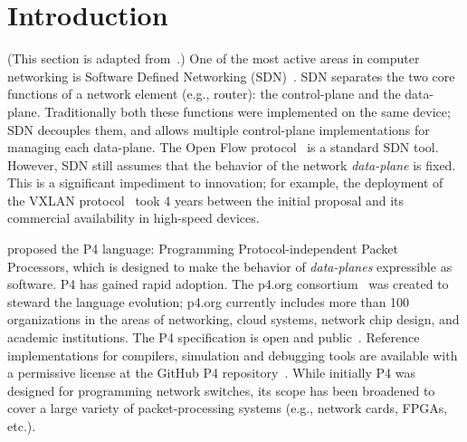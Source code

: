  \section{Introduction}\label{sec:introduction}

(This section is adapted from~\cite{budiu-osr17}.)  One of the most
 active areas in computer networking is Software Defined Networking
 (SDN)~\cite{rfc7426}.  SDN separates the two core functions of a
 network element (e.g., router): the control-plane and the data-plane.
 Traditionally both these functions were implemented on the same
 device; SDN decouples them, and allows multiple control-plane
 implementations for managing each data-plane.  The Open Flow
 protocol~\cite{mckeown-ccr08} is a standard SDN tool.  However, SDN
 still assumes that the behavior of the network \emph{data-plane} is
 fixed.  This is a significant impediment to innovation; for example,
 the deployment of the VXLAN protocol~\cite{rfc7348} took 4 years
 between the initial proposal and its commercial availability in
 high-speed devices.

\cite{bosshart-ccr14} proposed the P4 language: Programming
Protocol-independent Packet Processors, which is designed to make the
behavior of \emph{data-planes} expressible as software.  P4 has gained
rapid adoption.  The p4.org consortium~\cite{p4org} was created to
steward the language evolution; p4.org currently includes more than
100 organizations in the areas of networking, cloud systems, network
chip design, and academic institutions.  The P4 specification is open
and public~\cite{p416-spec17}.  Reference implementations for
compilers, simulation and debugging tools are available with a
permissive license at the GitHub P4 repository~\cite{p4lang}.  While
initially P4 was designed for programming network switches, its scope
has been broadened to cover a large variety of packet-processing
systems (e.g., network cards, FPGAs, etc.).

